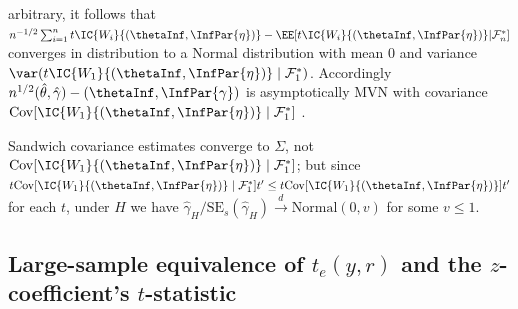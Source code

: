  arbitrary, it follows that $n^{-1/2}\sum_{i=1}^{n}  t \IC{W_{i}}{(\thetaInf,
    \InfPar{\eta})} - \EE[  t  \IC{W_{i}}{(\thetaInf,
    \InfPar{\eta})}\vert  \mathcal{F}_{n}^{*} ]$ converges in
  distribution to a Normal distribution with mean 0 and
  variance $\var( t \IC{W_{1}}{(\thetaInf,
    \InfPar{\eta})} \mid \mathcal{F}_{1}^{*} )$.  Accordingly
  $n^{1/2}(\hat\theta, \hat\gamma) - (\thetaInf, \InfPar{\gamma})$ is
  asymptotically MVN with covariance
$\mathrm{Cov}[\IC{W_{1}}{(\thetaInf,
    \InfPar{\eta})} \mid \mathcal{F}_{1}^{*} ]$%
.

Sandwich covariance estimates converge to $\Sigma$, not
$\mathrm{Cov}[\IC{W_{1}}{(\thetaInf, \InfPar{\eta})} \mid\mathcal{F}_{1}^{*} ]$;
but since
$t \mathrm{Cov}[\IC{W_{1}}{(\thetaInf, \InfPar{\eta})} \mid \mathcal{F}_{1}^{*} ] t'
\leq t \mathrm{Cov}[\IC{W_{1}}{(\thetaInf, \InfPar{\eta})}] t'$ for
each $t$, under $H$ we have $\hat{\gamma}_{H}/\mathrm{SE}_{s}(\hat{\gamma}_{H})
\stackrel{d}{\rightarrow} \mathrm{Normal}(0, v)$ for some $v\leq 1$.


\subsection{Large-sample equivalence of $t_{e}(y, r)$ and the
 $z$-coefficient's $t$-statistic} \label{sec:suppl-s-refs}

